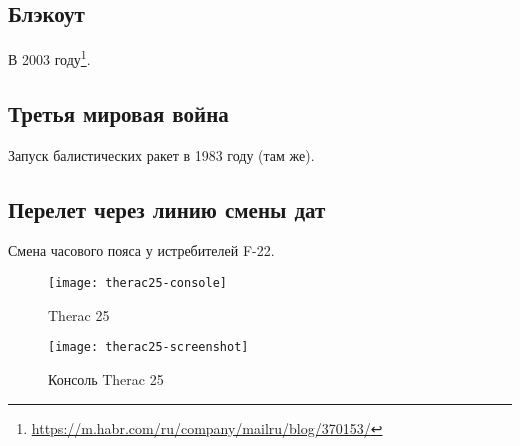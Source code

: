 \subsection{Блэкоут}
    В 2003 году\footnote{\url{https://m.habr.com/ru/company/mailru/blog/370153/}}.
\subsection{Третья мировая война} %
    Запуск балистических ракет в 1983 году (там же).
    \subsection{Перелет через линию смены дат}
    Смена часового пояса у истребителей F-22. 

\begin{center}
\begin{figure}[hb]
    \texttt{[image: therac25-console]}
    \caption{Therac 25}\label{fig:therac25}
    \texttt{[image: therac25-screenshot]}
    \caption{Консоль Therac 25}\label{fig:therac25_console}
\end{figure}
\end{center}
